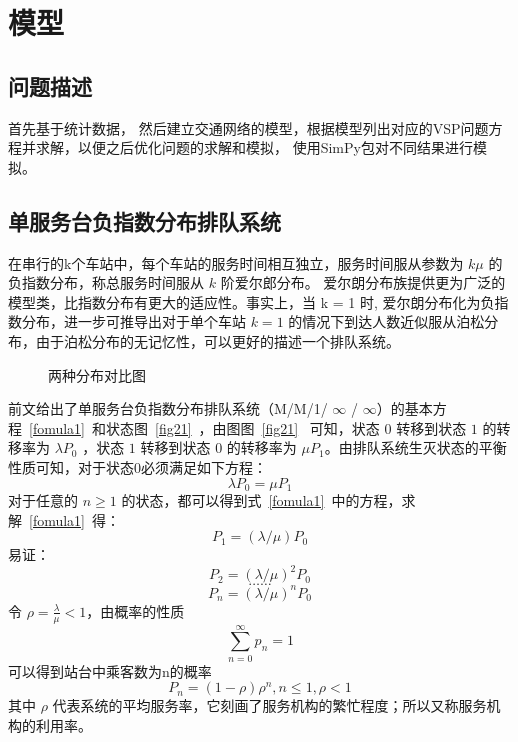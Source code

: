 \section{模型}

\subsection{问题描述}
首先基于统计数据，
然后建立交通网络的模型，根据模型列出对应的VSP问题方程并求解，以便之后优化问题的求解和模拟，
使用SimPy包对不同结果进行模拟。

\subsection{单服务台负指数分布排队系统}
在串行的k个车站中，每个车站的服务时间相互独立，服务时间服从参数为 $k \mu$ 的负指数分布，称总服务时间服从 $k$ 阶爱尔郎分布。
爱尔朗分布族提供更为广泛的模型类，比指数分布有更大的适应性。事实上，当 k = 1 时, 爱尔朗分布化为负指数分布，进一步可推导出对于单个车站
$k=1$ 的情况下到达人数近似服从泊松分布，由于泊松分布的无记忆性\cite{gll}，可以更好的描述一个排队系统。
\begin{figure}[htbp!]
    \centering
    \caption{两种分布对比图}
    \label{dis1}
\end{figure}


前文给出了单服务台负指数分布排队系统（M/M/1/ $\infty $ / $\infty $）的基本方程~\ref{fomula1}~和状态图~\ref{fig21}~，由图图~\ref{fig21}~
可知，状态 $0$ 转移到状态 $1$ 的转移率为 $\lambda P_0$ ，状态 $1$ 转移到状态 $0$ 的转移率为 $\mu P_1$。由排队系统生灭状态的平衡性质可知，对于状态0必须满足如下方程：
$$\lambda P_0 = \mu P_1$$
对于任意的 $n \ge 1$ 的状态，都可以得到式~\ref{fomula1}~中的方程，求解~\ref{fomula1}~得：
$$P_1 = (\lambda / \mu)P_0$$
易证：
$$P_2 = \left(\lambda / \mu \right)^2 P_0$$
$$……$$
$$P_n = \left(\lambda / \mu \right)^n P_0$$
令 $\rho = \frac{\lambda}{\mu} < 1$，由概率的性质
$$\sum_{n=0}^{\infty}p_n = 1$$ 可以得到站台中乘客数为n的概率 $$P_n = (1-\rho)\rho^n, n \le 1, \rho < 1$$
其中 $\rho$ 代表系统的平均服务率，它刻画了服务机构的繁忙程度；所以又称服务机构的利用率。

